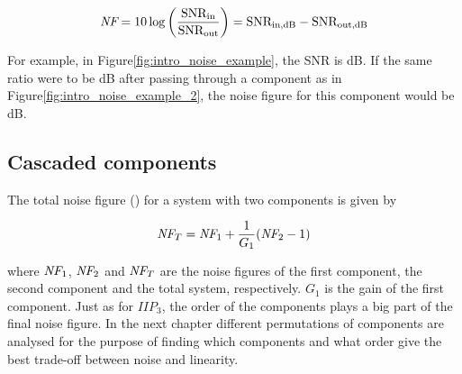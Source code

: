 			\begin{equation}
				\emph{NF}=10\log \left(\frac{ \text{SNR}_\text{in} }{ \text{SNR}_\text{out} }\right) = \text{SNR}_\text{in,dB} -\text{SNR}_\text{out,dB}
			\end{equation}

			For example, in Figure\autoref{fig:intro_noise_example}, the SNR is \unit[67]{dB}. If the same ratio were to be \unit[47]{dB} after passing through a component as in Figure\autoref{fig:intro_noise_example_2}, the noise figure for this component would be \unit[20]{dB}.


		\subsection{Cascaded components}
			The total noise figure (\nf) for a system with two components is given by \autocite{pozar90}

			\begin{equation}\label{eq:cascnoise}
				\emph{NF}_T=\emph{NF}_1+\frac{1}{G_1}(\emph{NF}_2-1)
			\end{equation}

			where $\emph{NF}_1$, $\emph{NF}_2$ and $\emph{NF}_T$ are the noise figures of the first component, the second component and the total system, respectively. $G_1$ is the gain of the first component. Just as for $IIP_3$, the order of the components plays a big part of the final noise figure. In the next chapter different permutations of components are analysed for the purpose of finding which components and what order give the best trade-off between noise and linearity.
